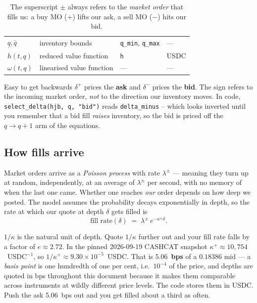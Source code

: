 \documentclass[11pt,a4paper]{article}
\newcommand{\dplus}{\delta^{+}}
\newcommand{\dminus}{\delta^{-}}
\newcommand{\code}[1]{\texttt{\small #1}}
\begin{document}
\begin{table}[htbp]
\begin{tabular}{@{}llll@{}}
$\underline{q},\bar{q}$ & inventory bounds            & \code{q\_min}, \code{q\_max} & --- \\
$h(t,q)$     & reduced value function                 & \code{h}                   & USDC \\
$\omega(t,q)$& linearised value function              & ---                        & --- \\
\bottomrule
\end{tabular}
\caption{The superscript $\pm$ always refers to the \emph{market order} that
fills us: a buy MO ($+$) lifts our ask, a sell MO ($-$) hits our bid.}
\label{tab:notation}
\end{table}

\begin{trap}{Easy to get backwards}
$\dplus$ prices the \textbf{ask} and $\dminus$ prices the \textbf{bid}. The sign
refers to the incoming market order, \emph{not} to the direction our inventory
moves. In code, \code{select\_delta(hjb, q, "bid")} reads \code{delta\_minus} --
which looks inverted until you remember that a bid fill \emph{raises} inventory,
so the bid is priced off the $q\to q+1$ arm of the equations.
\end{trap}

\subsection{How fills arrive}

Market orders arrive as a \emph{Poisson process} with rate $\lambda^{\pm}$ ---
meaning they turn up at random, independently, at an average of $\lambda^{\pm}$
per second, with no memory of when the last one came. Whether one reaches
\emph{our} order depends on how deep we posted. The model assumes the
probability decays exponentially in depth, so the rate at which our quote at
depth $\delta$ gets filled is
\begin{equation}
  \text{fill rate}(\delta) \;=\; \lambda^{\pm}\, e^{-\kappa^{\pm}\delta}.
  \label{eq:fillrate}
\end{equation}

\begin{intuition}
$1/\kappa$ is the natural unit of depth. Quote $1/\kappa$ further out and your
fill rate falls by a factor of $e \approx 2.72$. In the pinned 2026-09-19
CASHCAT snapshot $\kappa^{+} \approx 10{,}754$~USDC$^{-1}$, so
$1/\kappa^{+} \approx 9.30\times10^{-5}$~USDC. That is $5.06$~\textbf{bps}
of a $0.18386$ mid --- a
\emph{basis point} is one hundredth of one per cent, i.e.\ $10^{-4}$ of the
price, and depths are quoted in bps throughout this document because it makes
them comparable across instruments at wildly different price levels. The code
stores them in USDC. Push the ask 5.06~bps
out and you get filled about a third as often.
\end{intuition}
\end{document}
